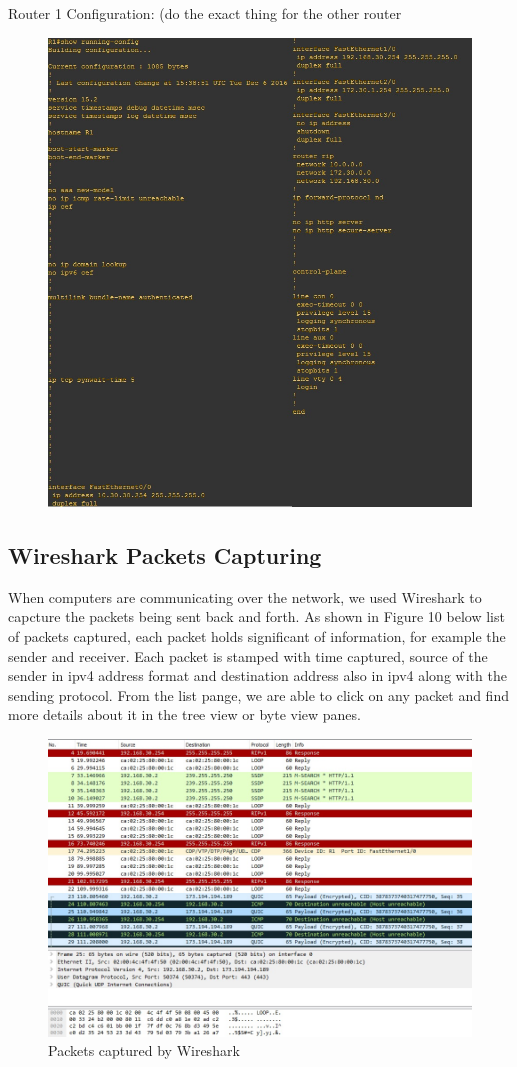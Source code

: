 \documentclass{article}
\begin{document}
Router 1 Configuration: (do the exact thing for the other router

\begin{figure}[H]
	\begin{center}
		\includegraphics[width=0.6
\textwidth]{Routerconfig.jpg}
	\end{center}
	\caption{\small  \newline}
	\label{fig:Prd}
\end{figure}


\subsection{Wireshark Packets Capturing}
When computers are communicating over the network, we used Wireshark to capcture the packets being sent back and forth. As shown in Figure 10 below list of packets captured, each packet holds significant of information, for example the sender and receiver. Each packet is stamped with time captured, source of the sender in ipv4 address format and destination address also in ipv4 along with the sending protocol. From the list pange, we are able to click on any packet and find more details about it in the tree view or byte view panes. 

\begin{figure}[H]
	\begin{center}
		\includegraphics[width=0.6
\textwidth]{wireshark.jpg}
	\end{center}
	\caption{Packets captured by Wireshark}
	\label{fig:Prd}
\end{figure}
\end{document}
